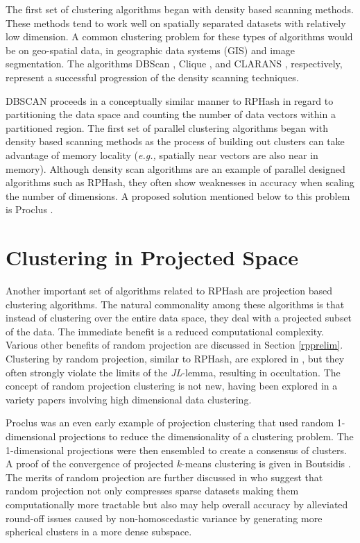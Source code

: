 The first set of clustering algorithms began with density based scanning methods.  These methods tend to work well on
spatially separated datasets with relatively low dimension.  A common clustering problem for these types of algorithms
would be on geo-spatial data, in geographic data systems (GIS) and image segmentation.  The algorithms DBScan
\cite{dbscan}, Clique \cite{clique}, and CLARANS \cite{Clarans}, respectively, represent a successful progression of the
density scanning techniques.


DBSCAN proceeds in a conceptually similar manner to \textsf{RPHash} in regard to partitioning the data space
and counting the number of data vectors within a partitioned region.  The first set of parallel clustering algorithms
began with density based scanning methods as the process of building out clusters can take advantage of memory locality
(\emph{e.g.,} spatially near vectors are also near in memory).  Although density scan algorithms are an example of
parallel designed algorithms such as \textsf{RPHash}, they often show weaknesses in accuracy when scaling the number of
dimensions.  A proposed solution mentioned below to this problem is Proclus \cite{Proclus}.

\section{Clustering in Projected Space}

Another important set of algorithms related to \textsf{RPHash} are projection based clustering algorithms.  The natural
commonality among these algorithms is that instead of clustering over the entire data space, they deal with a projected
subset of the data.  The immediate benefit is a reduced computational complexity.  Various other benefits of random
projection are discussed in Section \ref{rpprelim}.  Clustering by random projection, similar to \textsf{RPHash}, are
explored in \cite{fernrandom,alweighted06,avogadri09}, but they often strongly violate the limits of the
\emph{JL}-lemma, resulting in occultation.  The concept of random projection clustering is not new, having been explored
in a variety papers involving high dimensional data clustering.

Proclus \cite{Proclus} was an even early example of projection clustering that used random 1-dimensional projections to
reduce the dimensionality of a clustering problem.  The 1-dimensional projections were then ensembled to create a
consensus of clusters.  A proof of the convergence of projected $k$-means clustering is given in Boutsidis
\cite{Boutsidis}.  The merits of random projection are further discussed in \cite{Dasgupta2000} who suggest that random
projection not only compresses sparse datasets making them computationally more tractable but also may help overall
accuracy by alleviated round-off issues caused by non-homoscedastic variance by generating more spherical clusters in a
more dense subspace.

